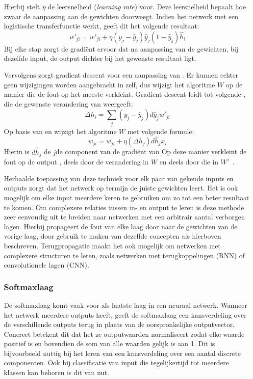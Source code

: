 Hierbij stelt $\eta$ de leersnelheid (\emph{learning rate}) voor. Deze leersnelheid bepaalt hoe zwaar de aanpassing aan de gewichten doorweegt.
Indien het netwerk met een logistische transferfunctie werkt, geeft dit het volgende resultaat:
\begin{equation}
    w'_{ji} = w'_{ji} + \eta(y_j-\hat{y}_j)\hat{y}_j(1-\hat{y}_j)\hat{h}_i
\end{equation}
Bij elke stap zorgt de gradi\"ent ervoor dat na aanpassing van de gewichten, bij dezelfde input, de output dichter bij het gewenste resultaat ligt.

Vervolgens zorgt gradient descent voor een aanpassing van . Er kunnen echter geen wijzigingen worden aangebracht in  zelf, dus wijzigt het algoritme ${W}$ op de manier die de fout op  het meeste verkleint. Gradient descent leidt tot volgende , die de gewenste verandering van  weergeeft:
\begin{equation}
    \Delta h_i = \sum\limits_{j}(y_j-\hat{y}_j)d\hat{y}_jw'_{ji}
\end{equation}
Op basis van  en  wijzigt het algoritme $W$ met volgende formule:
\begin{equation}
    w_{ji} = w_{ji} + \eta(\Delta h_j)d\hat{h}_jx_i
\end{equation}
Hierin is $d\hat{h}_j$ de $j$de component van de gradi\"ent van 
Op deze manier verkleint de fout op de output , deels door de verandering in ${W}$ en deels door die in ${W'}$~\cite{Blockeel}.

Herhaalde toepassing van deze techniek voor elk paar van gekende inputs en outputs zorgt dat het netwerk op termijn de juiste gewichten leert. Het is ook mogelijk om elke input meerdere keren te gebruiken om zo tot een beter resultaat te komen. Om complexere relaties tussen in- en output te leren is deze methode zeer eenvoudig uit te breiden naar netwerken met een arbitrair aantal verborgen lagen. Hierbij propageert de fout van elke laag door naar de gewichten van de vorige laag, door gebruik te maken van dezelfde concepten als hierboven beschreven. Terugpropagatie maakt het ook mogelijk om netwerken met complexere structuren te leren, zoals netwerken met terugkoppelingen (RNN) of convolutionele lagen (CNN).

\subsubsection{Softmaxlaag}\label{par:softmax}
De softmaxlaag komt vaak voor als laatste laag in een neuraal netwerk. Wanneer het netwerk meerdere outputs heeft, geeft de softmaxlaag een kansverdeling over de verschillende outputs terug in plaats van de oorspronkelijke outputvector. Concreet betekent dit dat het ze outputwaarden normaliseert zodat elke waarde positief is en bovendien de som van alle waarden gelijk is aan 1. Dit is bijvoorbeeld nuttig bij het leren van een kansverdeling over een aantal discrete componenten. Ook bij classificatie van input die tegelijkertijd tot meerdere klassen kan behoren is dit van nut.

